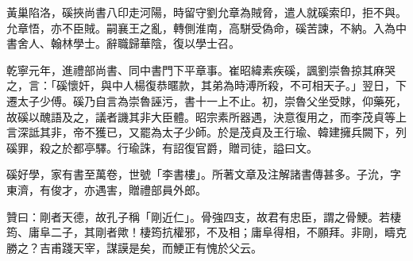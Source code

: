 \begin{pinyinscope}
 黃巢陷洛，磎挾尚書八印走河陽，時留守劉允章為賊脅，遣人就磎索印，拒不與。允章悟，亦不臣賊。嗣襄王之亂，轉側淮南，高駢受偽命，磎苦諫，不納。入為中書舍人、翰林學士。辭職歸華陰，復以學士召。



 乾寧元年，進禮部尚書、同中書門下平章事。崔昭緯素疾磎，諷劉崇魯掠其麻哭之，言：「磎懷奸，與中人楊復恭暱款，其弟為時溥所殺，不可相天子。」翌日，下遷太子少傅。磎乃自言為崇魯誣污，書十一上不止。初，崇魯父坐受賕，仰藥死，故磎以醜語及之，議者譏其非大臣體。昭宗素所器遇，決意復用之，而李茂貞等上言深詆其非，帝不獲已，又罷為太子少師。於是茂貞及王行瑜、韓建擁兵闕下，列磎罪，殺之於都亭驛。行瑜誅，有詔復官爵，贈司徒，謚曰文。



 磎好學，家有書至萬卷，世號「李書樓」。所著文章及注解諸書傳甚多。子沇，字東濟，有俊才，亦遇害，贈禮部員外郎。



 贊曰：剛者天德，故孔子稱「剛近仁」。骨強四支，故君有忠臣，謂之骨鯁。若棲筠、庸阜二子，其剛者歟！棲筠抗權邪，不及相；庸阜得相，不願拜。非剛，疇克勝之？吉甫踐天宰，謀謨是矣，而鯁正有愧於父云。



\end{pinyinscope}